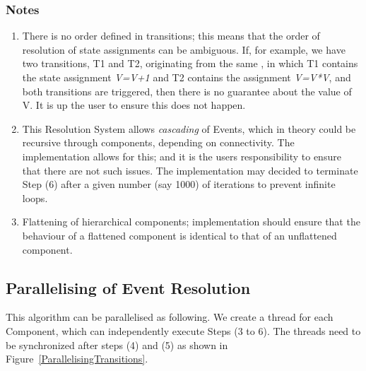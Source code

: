 \documentclass[draftspec]{ninemlspec}
\newcommand{\Regime}{\defRef{\textbf{\class{Regime}}\xspace}{sec:Regime}}
\begin{document}
\subsubsection{Notes}

\begin{enumerate}
\item  There is no order defined in transitions; this means
that the order of resolution of state assignments can be ambiguous. If, for
example, we have two transitions, T1 and T2, originating from the same \Regime,
in which T1 contains the state assignment \textsl{V=V+1} and T2 contains the
assignment \textsl{V=V*V}, and both transitions are triggered, then there is no
guarantee about the value of V. It is up the user to ensure this does not
happen.

\item This Resolution System allows \emph{cascading} of Events, which in theory
could be recursive through components, depending on connectivity. The
implementation allows for this; and it is the users responsibility to ensure
that there are not such issues. The implementation may decided to terminate
Step (6) after a given number (say 1000) of iterations to prevent infinite
loops.

\item Flattening of hierarchical components; implementation should ensure that
the behaviour of a flattened component is identical to that of an unflattened
component.
\end{enumerate}

\subsection{Parallelising of Event Resolution}

This algorithm can be parallelised as following. We create a thread for each
Component, which can independently execute Steps (3 to 6). The threads need
to be synchronized after steps (4) and (5) as shown in
Figure~\ref{ParallelisingTransitions}.
\end{document}
